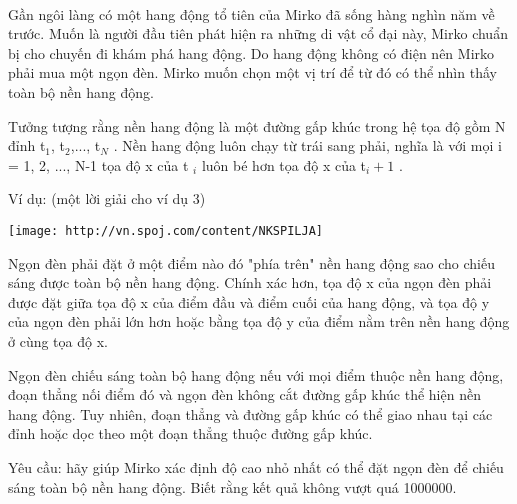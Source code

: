  

Gần ngôi làng có một hang động tổ tiên của Mirko đã sống hàng nghìn năm về trước. Muốn là người đầu tiên phát hiện ra những di vật cổ đại này, Mirko chuẩn bị cho chuyến đi khám phá hang động. Do hang động không có điện nên Mirko phải mua một ngọn đèn. Mirko muốn chọn một vị trí để từ đó có thể nhìn thấy toàn bộ nền hang động.

Tưởng tượng rằng nền hang động là một đường gấp khúc trong hệ tọa độ gồm N đỉnh t$_1$, t$_2$,..., t$_N $ . Nền hang động luôn chạy từ trái sang phải, nghĩa là với mọi i = 1, 2, ..., N-1 tọa độ x của t $_ i $ luôn bé hơn tọa độ x của t$_i+1 $ .

Ví dụ: (một lời giải cho ví dụ 3)


\texttt{[image: http://vn.spoj.com/content/NKSPILJA]}

Ngọn đèn phải đặt ở một điểm nào đó "phía trên" nền hang động sao cho chiếu sáng được toàn bộ nền hang động. Chính xác hơn, tọa độ x của ngọn đèn phải được đặt giữa tọa độ x của điểm đầu và điểm cuối của hang động, và tọa độ y của ngọn đèn phải lớn hơn hoặc bằng tọa độ y của điểm nằm trên nền hang động ở cùng tọa độ x.

Ngọn đèn chiếu sáng toàn bộ hang động nếu với mọi điểm thuộc nền hang động, đoạn thẳng nối điểm đó và ngọn đèn không cắt đường gấp khúc thể hiện nền hang động. Tuy nhiên, đoạn thẳng và đường gấp khúc có thể giao nhau tại các đỉnh hoặc dọc theo một đoạn thẳng thuộc đường gấp khúc.

Yêu cầu: hãy giúp Mirko xác định độ cao nhỏ nhất có thể đặt ngọn đèn để chiếu sáng toàn bộ nền hang động. Biết rằng kết quả không vượt quá 1000000.